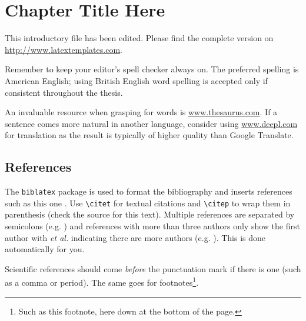
\chapter{Chapter Title Here} %
\label{ch:name} %


\newcommand{\keyword}[1]{\textbf{#1}}
\newcommand{\tabhead}[1]{\textbf{#1}}
\newcommand{\code}[1]{\texttt{#1}}
\newcommand{\file}[1]{\texttt{\bfseries#1}}
\newcommand{\option}[1]{\texttt{\itshape#1}}


This introductory file has been edited. Please find the complete version on \url{http://www.latextemplates.com}.

Remember to keep your editor's spell checker always on. The preferred spelling is American English; using British English word spelling is accepted only if consistent throughout the thesis.

An invaluable resource when grasping for words is \url{www.thesaurus.com}. If a sentence comes more natural in another language, consider using \url{www.deepl.com} for translation as the result is typically of higher quality than Google Translate.

\section{References}

The \code{biblatex} package is used to format the bibliography and inserts references such as this one \citep{Reference1}. Use \verb|\citet| for textual citations and \verb|\citep| to wrap them in parenthesis (check the source for this text). %
Multiple references are separated by semicolons (e.g. \citet{Reference2, Reference1}) and references with more than three authors only show the first author with \emph{et al.} indicating there are more authors (e.g. \citet{Reference3}). This is done automatically for you.

Scientific references should come \emph{before} the punctuation mark if there is one (such as a comma or period). The same goes for footnotes\footnote{Such as this footnote, here down at the bottom of the page.}.

